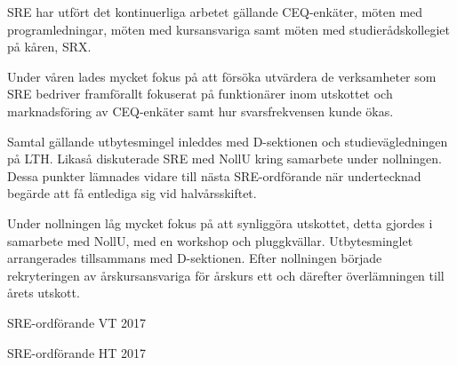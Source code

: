 \documentclass[../_main/handlingar.tex]{subfiles}
\begin{document}
SRE har utfört det kontinuerliga arbetet gällande CEQ-enkäter, möten med programledningar, möten med kursansvariga samt möten med studierådskollegiet på kåren, SRX.

Under våren lades mycket fokus på att försöka utvärdera de verksamheter som SRE bedriver framförallt fokuserat på funktionärer inom utskottet och marknadsföring av CEQ-enkäter samt hur svarsfrekvensen kunde ökas.

Samtal gällande utbytesmingel inleddes med D-sektionen och studievägledningen på LTH. Likaså diskuterade SRE med NollU kring samarbete under nollningen. Dessa punkter lämnades vidare till nästa SRE-ordförande när undertecknad begärde att få entlediga sig vid halvårsskiftet.

Under nollningen låg mycket fokus på att synliggöra utskottet, detta gjordes i samarbete med NollU, med en workshop och pluggkvällar. Utbytesminglet arrangerades tillsammans med D-sektionen. Efter nollningen började rekryteringen av årskursansvariga för årskurs ett och därefter överlämningen till årets utskott.

\begin{signatures}{1}
    \mvh
    \signature{Pontus Landgren}{SRE-ordförande VT 2017}
    \signature{Edvard Carlsson}{SRE-ordförande HT 2017}
\end{signatures}
\end{document}
